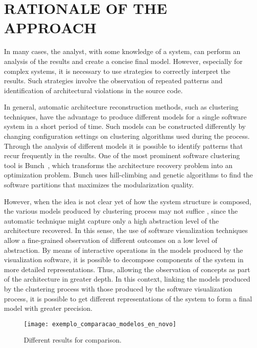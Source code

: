 \section{RATIONALE OF THE APPROACH}\label{sec:rationale}%

In many cases, the analyst, with some knowledge of a system, can perform an analysis of the results and create a concise final model. However, especially for complex systems, it is necessary to use strategies to correctly interpret the results. Such strategies involve the observation of repeated patterns and identification of architectural violations in the source code.

In general, automatic architecture reconstruction methods, such as clustering techniques, have the advantage to produce different models for a single software system in a short period of time. Such models can be constructed differently by changing configuration settings on clustering algorithms used during the process. Through the analysis of different models it is possible to identify patterns that recur frequently in the results. One of the most prominent software clustering tool is Bunch~\cite{mitchell_heuristic_2002}, which transforms the architecture recovery problem into an optimization problem. Bunch uses hill-climbing and genetic algorithms to find the software partitions that maximizes the modularization quality.  %

However, when the idea is not clear yet of how the system structure is composed, the various models produced by clustering process may not suffice \cite{craft}, since the automatic technique might capture only a high abstraction level of the architecture recovered. In this sense, the use of software visualization techniques allow a fine-grained observation of different outcomes on a low level of abstraction. By means of interactive operations in the models produced by the visualization software, it is possible to decompose components of the system in more detailed representations. Thus, allowing the observation of concepts as part of the architecture in greater depth. In this context, linking the models produced by the clustering process with those produced by the software visualization process, it is possible to get different representations of the system to form a final model with greater precision. 
\begin{figure}[!h]
	\centering
	\texttt{[image: exemplo\_comparacao\_modelos\_en\_novo]}
	\caption{Different results for comparison.}
	\label{exemplo_comparacao_modelos}
\end{figure}

